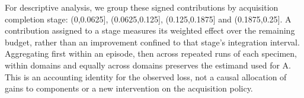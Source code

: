 For descriptive analysis, we group these signed contributions by acquisition completion stage: (0,0.0625{]}, (0.0625,0.125{]}, (0.125,0.1875{]} and (0.1875,0.25{]}. A contribution assigned to a stage measures its weighted effect over the remaining budget, rather than an improvement confined to that stage's integration interval. Aggregating first within an episode, then across repeated runs of each specimen, within domains and equally across domains preserves the estimand used for A. This is an accounting identity for the observed loss, not a causal allocation of gains to components or a new intervention on the acquisition policy.
